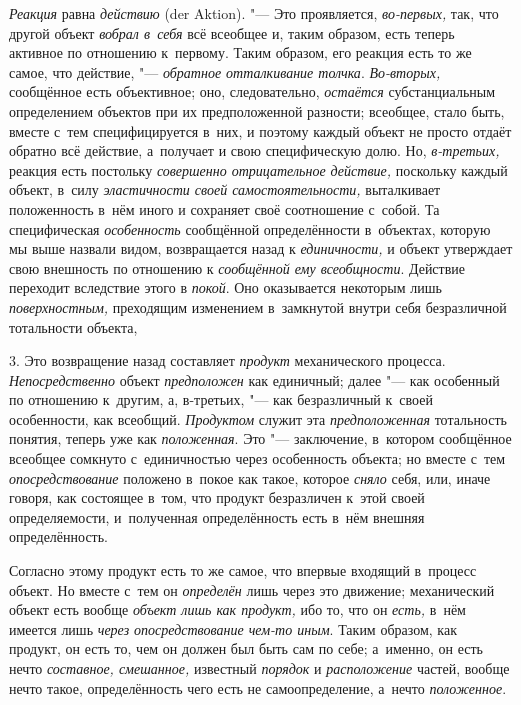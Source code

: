 {\em Реакция} равна
{\em действию} (der Aktion). "---
Это проявляется,
{\em во-первых,}
так, что другой объект
{\em вобрал в~себя} всё
всеобщее и, таким образом, есть теперь активное по отношению к~первому.
Таким образом, его реакция есть то же самое, что действие, "---
{\em обратное отталкивание толчка}.
{\em Во-вторых,}
сообщённое есть объективное; оно, следовательно,
{\em остаётся}
субстанциальным определением объектов при их предположенной
разности; всеобщее, стало быть, вместе с~тем специфицируется в~них, и
поэтому каждый объект не просто отдаёт обратно всё действие, а~получает и
свою специфическую долю. Но,
{\em в-третьих,} реакция
есть постольку {\em совершенно
отрицательное действие,} поскольку каждый объект, в~силу
{\em эластичности своей
самостоятельности,} выталкивает положенность в~нём иного и
сохраняет своё соотношение с~собой. Та специфическая
{\em особенность}
сообщённой определённости в~объектах, которую мы выше назвали
видом, возвращается назад к
{\em единичности,} и
объект утверждает свою внешность по отношению к
{\em сообщённой ему всеобщности}.
Действие переходит вследствие этого в
{\em покой}. Оно
оказывается некоторым лишь
{\em поверхностным,}
преходящим изменением в~замкнутой внутри себя безразличной
тотальности объекта,

3. Это возвращение назад составляет
{\em продукт}
механического процесса. {\em Непосредственно} объект {\em предположен}
как единичный; далее "--- как особенный по отношению к~другим, а,
в-третьих, "--- как безразличный к~своей особенности, как всеобщий.
{\em Продуктом} служит эта {\em предположенная} тотальность понятия,
теперь уже как {\em положенная}. Это "--- заключение,
в~котором сообщённое всеобщее сомкнуто с~единичностью через
особенность объекта; но вместе с~тем {\em опосредствование}
положено в~покое как такое, которое {\em сняло} себя, или,
иначе говоря, как состоящее в~том, что продукт безразличен к~этой своей
определяемости, и~полученная определённость есть в~нём внешняя определённость.

Согласно этому продукт есть то же самое, что впервые входящий
в~процесс объект. Но вместе с~тем он {\em определён} лишь
через это движение; механический объект есть вообще
{\em объект лишь как продукт,} ибо то, что он {\em есть,} в~нём имеется
лишь {\em через опосредствование
чем-то иным}. Таким образом, как продукт, он есть то,
чем он должен был быть сам по себе; а~именно, он есть нечто
{\em составное, смешанное,} известный {\em порядок} и {\em расположение}
частей, вообще нечто такое, определённость чего есть не
самоопределение, а~нечто {\em положенное}.

